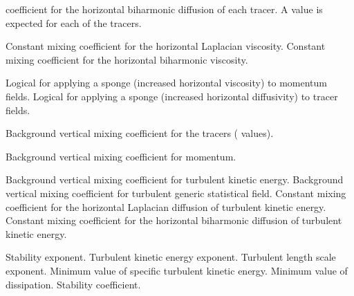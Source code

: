 \begin{klist}
\begin{klist}
     coefficient for the horizontal biharmonic diffusion of each tracer.
     A value is expected for each of the  tracers.
     \end{klist}
    \mbox{}
     \begin{klist}
           Constant mixing coefficient for the horizontal
     Laplacian viscosity.
           Constant mixing coefficient for the horizontal
     biharmonic viscosity.
     \end{klist}
    \mbox{}
     \begin{klist}
          Logical for applying a sponge (increased
     horizontal viscosity) to momentum fields.
         Logical for applying a sponge
     (increased horizontal diffusivity) to tracer fields.
     \end{klist}
    \mbox{}
     \begin{klist}
         Background vertical mixing coefficient
     for the tracers ( values).
     \end{klist}
    \mbox{}
     \begin{klist}
         Background vertical mixing coefficient 
     for momentum.
     \end{klist}
    \mbox{}
     \begin{klist}
         Background vertical mixing coefficient
     for turbulent kinetic energy.
         Background vertical mixing coefficient
     for turbulent generic statistical field.
           Constant mixing coefficient for the horizontal
     Laplacian diffusion of turbulent kinetic energy.
           Constant mixing coefficient for the horizontal
     biharmonic diffusion of turbulent kinetic energy.
     \end{klist}
   \mbox{}
     \begin{klist}
          Stability exponent.
          Turbulent kinetic energy exponent.
          Turbulent length scale exponent.
         Minimum value of specific turbulent kinetic
       energy.
         Minimum value of dissipation.
          Stability coefficient.

\end{klist}
\end{klist}
